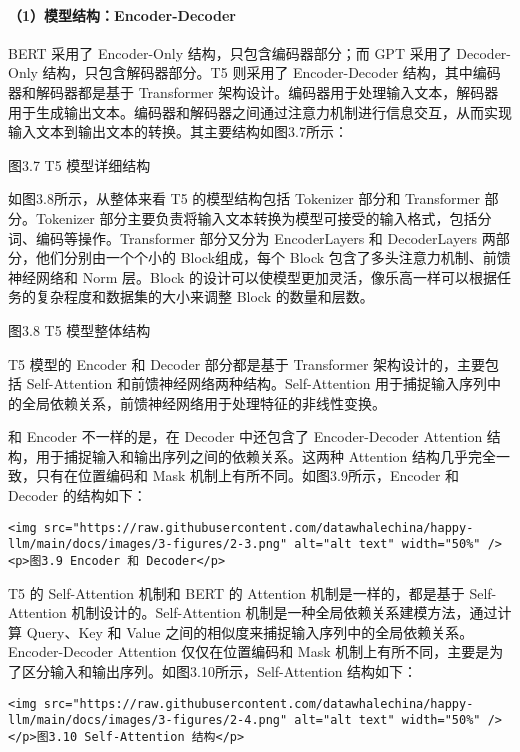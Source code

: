 \documentclass[
]{article}
\begin{document}
\paragraph{（1）模型结构：Encoder-Decoder}\label{ux6a21ux578bux7ed3ux6784encoder-decoder}

BERT 采用了 Encoder-Only 结构，只包含编码器部分；而 GPT 采用了
Decoder-Only 结构，只包含解码器部分。T5 则采用了 Encoder-Decoder
结构，其中编码器和解码器都是基于 Transformer
架构设计。编码器用于处理输入文本，解码器用于生成输出文本。编码器和解码器之间通过注意力机制进行信息交互，从而实现输入文本到输出文本的转换。其主要结构如图3.7所示：

图3.7 T5 模型详细结构

如图3.8所示，从整体来看 T5 的模型结构包括 Tokenizer 部分和 Transformer
部分。Tokenizer
部分主要负责将输入文本转换为模型可接受的输入格式，包括分词、编码等操作。Transformer
部分又分为 EncoderLayers 和 DecoderLayers 两部分，他们分别由一个个小的
Block组成，每个 Block 包含了多头注意力机制、前馈神经网络和 Norm
层。Block
的设计可以使模型更加灵活，像乐高一样可以根据任务的复杂程度和数据集的大小来调整
Block 的数量和层数。

图3.8 T5 模型整体结构

T5 模型的 Encoder 和 Decoder 部分都是基于 Transformer
架构设计的，主要包括 Self-Attention
和前馈神经网络两种结构。Self-Attention
用于捕捉输入序列中的全局依赖关系，前馈神经网络用于处理特征的非线性变换。

和 Encoder 不一样的是，在 Decoder 中还包含了 Encoder-Decoder Attention
结构，用于捕捉输入和输出序列之间的依赖关系。这两种 Attention
结构几乎完全一致，只有在位置编码和 Mask
机制上有所不同。如图3.9所示，Encoder 和 Decoder 的结构如下：

\begin{verbatim}
<img src="https://raw.githubusercontent.com/datawhalechina/happy-llm/main/docs/images/3-figures/2-3.png" alt="alt text" width="50%" />
<p>图3.9 Encoder 和 Decoder</p>
\end{verbatim}

T5 的 Self-Attention 机制和 BERT 的 Attention 机制是一样的，都是基于
Self-Attention 机制设计的。Self-Attention
机制是一种全局依赖关系建模方法，通过计算 Query、Key 和 Value
之间的相似度来捕捉输入序列中的全局依赖关系。Encoder-Decoder Attention
仅仅在位置编码和 Mask
机制上有所不同，主要是为了区分输入和输出序列。如图3.10所示，Self-Attention
结构如下：

\begin{verbatim}
<img src="https://raw.githubusercontent.com/datawhalechina/happy-llm/main/docs/images/3-figures/2-4.png" alt="alt text" width="50%" />
</p>图3.10 Self-Attention 结构</p>
\end{verbatim}
\end{document}
